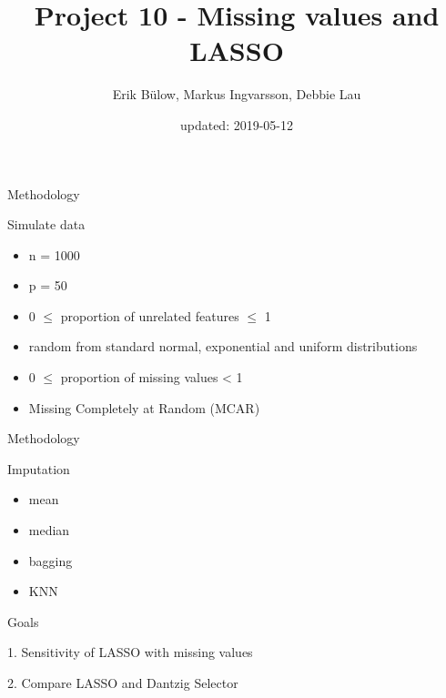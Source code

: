 \documentclass[ignorenonframetext,]{beamer}
\title{Project 10 - Missing values and LASSO}
\author{Erik Bülow, Markus Ingvarsson, Debbie Lau}
\date{updated: 2019-05-12}
\providecommand{\tightlist}{%
  \setlength{\itemsep}{0pt}\setlength{\parskip}{0pt}}
\begin{document}
\frame{\titlepage}

\begin{frame}{Methodology}

\begin{block}{Simulate data}

\begin{itemize}
\tightlist
\item
  n = 1000
\item
  p = 50
\item
  0 \(\leq\) proportion of unrelated features \(\leq\) 1
\item
  random from standard normal, exponential and uniform distributions
\item
  0 \(\leq\) proportion of missing values \textless{} 1
\item
  Missing Completely at Random (MCAR)
\end{itemize}

\end{block}

\end{frame}

\begin{frame}{Methodology}

\begin{block}{Imputation}

\begin{itemize}
\tightlist
\item
  mean
\item
  median
\item
  bagging
\item
  KNN
\end{itemize}

\end{block}

\end{frame}

\begin{frame}{Goals}

\begin{block}{1. Sensitivity of LASSO with missing values}

\end{block}

\begin{block}{2. Compare LASSO and Dantzig Selector}

\end{block}

\end{frame}
\end{document}
